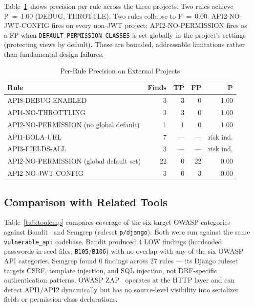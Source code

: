 \documentclass[conference]{IEEEtran}
\begin{document}
Table~\ref{tab:perrule} shows precision per rule across the three projects.
Two rules achieve P~=~1.00 (DEBUG, THROTTLE). Two rules collapse to
P~=~0.00: API2-NO-JWT-CONFIG fires on every non-JWT project; API2-NO-PERMISSION
fires as a FP when \texttt{DEFAULT\_PERMISSION\_CLASSES} is set globally in
the project's settings (protecting views by default). These are bounded,
addressable limitations rather than fundamental design failures.

\begin{table}[htbp]
\caption{Per-Rule Precision on External Projects}
\label{tab:perrule}
\centering
\small
\setlength{\tabcolsep}{3pt}
\begin{tabular}{@{}lrrrr@{}}
\toprule
\textbf{Rule} & \textbf{Finds} & \textbf{TP} & \textbf{FP} & \textbf{P} \\
\midrule
API8-DEBUG-ENABLED       & 3 & 3 & 0 & 1.00 \\
API4-NO-THROTTLING       & 3 & 3 & 0 & 1.00 \\
API2-NO-PERMISSION (no global default) & 1 & 1 & 0 & 1.00 \\
API1-BOLA-URL            & 7 & — & — & risk ind. \\
API3-FIELDS-ALL          & 3 & — & — & risk ind. \\
API2-NO-PERMISSION (global default set) & 22 & 0 & 22 & 0.00 \\
API2-NO-JWT-CONFIG       & 3 & 0 & 3  & 0.00 \\
\bottomrule
\end{tabular}
\end{table}

\subsection{Comparison with Related Tools}

Table~\ref{tab:toolcmp} compares coverage of the six target OWASP categories
against Bandit~\cite{bandit} and Semgrep (ruleset \texttt{p/django}).
Both were run against the same \texttt{vulnerable\_api} codebase.
Bandit produced 4 LOW findings (hardcoded passwords in seed files; \texttt{B105}/\texttt{B106})
with no overlap with any of the six OWASP API categories.
Semgrep found 0 findings across 27 rules — its Django ruleset targets CSRF,
template injection, and SQL injection, not DRF-specific authentication patterns.
OWASP ZAP~\cite{owaspzap} operates at the HTTP layer and can detect API1/API2
dynamically but has no source-level visibility into serializer fields or
permission-class declarations.
\end{document}
